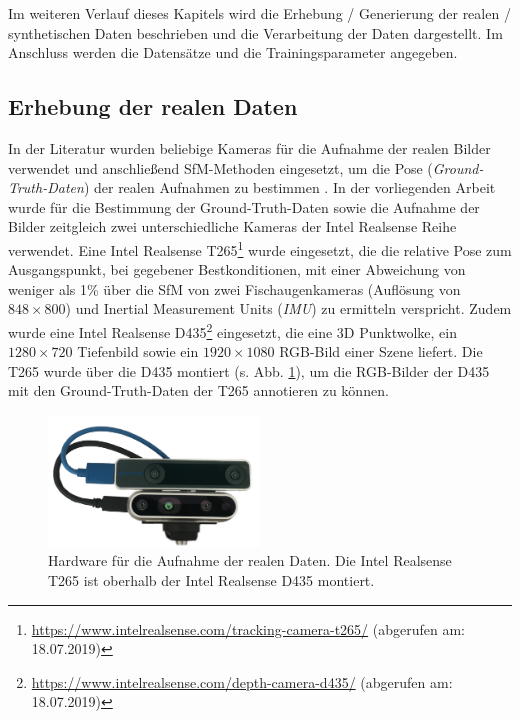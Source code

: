 Im weiteren Verlauf dieses Kapitels wird die Erhebung / Generierung der realen / synthetischen Daten beschrieben und die Verarbeitung der Daten dargestellt. Im Anschluss werden die Datensätze und die Trainingsparameter angegeben. 



\subsection{Erhebung der realen Daten}
\label{subsec:record_real_data}
In der Literatur wurden beliebige Kameras für die Aufnahme der realen Bilder verwendet und anschließend SfM-Methoden eingesetzt, um die Pose (\textit{Ground-Truth-Daten}) der realen Aufnahmen zu bestimmen \cite{kendallPoseNetConvolutionalNetwork2015, clarkVidLocDeepSpatioTemporal2017, acharyaBIMPoseNetIndoorCamera2019}. 
In der vorliegenden Arbeit wurde für die Bestimmung der Ground-Truth-Daten sowie die Aufnahme der Bilder zeitgleich zwei unterschiedliche Kameras der Intel Realsense Reihe verwendet. Eine Intel Realsense T265\footnote{\url{https://www.intelrealsense.com/tracking-camera-t265/} (abgerufen am: 18.07.2019)} wurde eingesetzt, die die relative Pose zum Ausgangspunkt, bei gegebener Bestkonditionen, mit einer Abweichung von weniger als 1\% über die SfM von zwei Fischaugenkameras (Auflösung von $848 \times 800$) und Inertial Measurement Units (\textit{IMU}) zu ermitteln verspricht. Zudem wurde eine Intel Realsense D435\footnote{ \url{https://www.intelrealsense.com/depth-camera-d435/} (abgerufen am: 18.07.2019)} eingesetzt, die eine 3D Punktwolke, ein $1280\times720$ Tiefenbild sowie ein $1920\times1080$ RGB-Bild einer Szene liefert. Die T265 wurde über die D435 montiert (s. Abb. \ref{fig:t265_d435}), um die RGB-Bilder der D435 mit den Ground-Truth-Daten der T265 annotieren zu können.

\begin{figure}
	\centering
	\includegraphics[width=0.5\textwidth]{images/real_dataset/t265_d435_2.png}
	\caption{Hardware für die Aufnahme der realen Daten. Die Intel Realsense T265 ist oberhalb der Intel Realsense D435 montiert.}
	\label{fig:t265_d435}
\end{figure}

